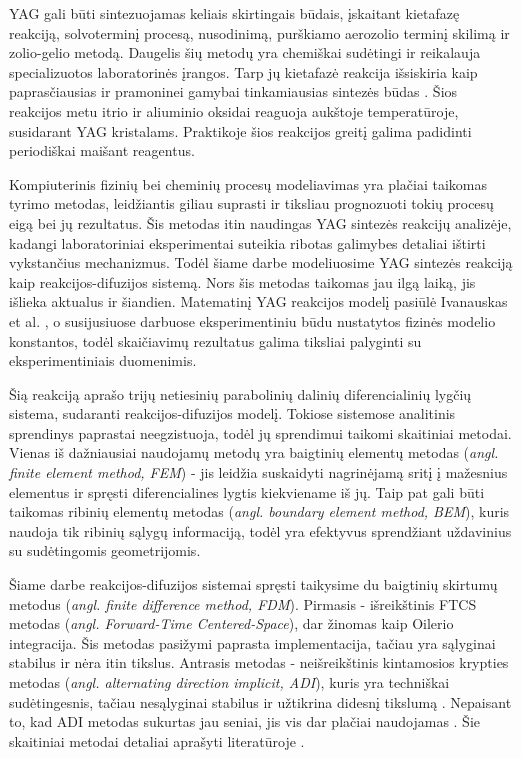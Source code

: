 \documentclass[]{VUMIFTemplateClass}
\begin{document}
YAG gali būti sintezuojamas keliais skirtingais būdais, įskaitant kietafazę reakciją, solvoterminį procesą, nusodinimą, purškiamo aerozolio terminį skilimą ir zolio-gelio metodą. Daugelis šių metodų yra chemiškai sudėtingi ir reikalauja specializuotos laboratorinės įrangos. Tarp jų kietafazė reakcija išsiskiria kaip paprasčiausias ir pramoninei gamybai tinkamiausias sintezės būdas \cite{zhangNovelSynthesisYAG2005}. Šios reakcijos metu itrio ir aliuminio oksidai reaguoja aukštoje temperatūroje, susidarant YAG kristalams. Praktikoje šios reakcijos greitį galima padidinti periodiškai maišant reagentus.

Kompiuterinis fizinių bei cheminių procesų modeliavimas yra plačiai taikomas tyrimo metodas, leidžiantis giliau suprasti ir tiksliau prognozuoti tokių procesų eigą bei jų rezultatus. Šis metodas itin naudingas YAG sintezės reakcijų analizėje, kadangi laboratoriniai eksperimentai suteikia ribotas galimybes detaliai ištirti vykstančius mechanizmus. Todėl šiame darbe modeliuosime YAG sintezės reakciją kaip reakcijos-difuzijos sistemą. Nors šis metodas taikomas jau ilgą laiką, jis išlieka aktualus ir šiandien. Matematinį YAG reakcijos modelį pasiūlė Ivanauskas et al. \cite{ivanauskasModellingSolidState2005}, o susijusiuose darbuose \cite{ivanauskasComputationalModellingYAG2009,mackeviciusCloserLookComputer2012} eksperimentiniu būdu nustatytos fizinės modelio konstantos, todėl skaičiavimų rezultatus galima tiksliai palyginti su eksperimentiniais duomenimis.

Šią reakciją aprašo trijų netiesinių parabolinių dalinių diferencialinių lygčių sistema, sudaranti reakcijos-difuzijos modelį. Tokiose sistemose analitinis sprendinys paprastai neegzistuoja, todėl jų sprendimui taikomi skaitiniai metodai. Vienas iš dažniausiai naudojamų metodų yra baigtinių elementų metodas (\textit{angl. finite element method, FEM}) - jis leidžia suskaidyti nagrinėjamą sritį į mažesnius elementus ir spręsti diferencialines lygtis kiekviename iš jų. Taip pat gali būti taikomas ribinių elementų metodas (\textit{angl. boundary element method, BEM}), kuris naudoja tik ribinių sąlygų informaciją, todėl yra efektyvus sprendžiant uždavinius su sudėtingomis geometrijomis.

Šiame darbe reakcijos-difuzijos sistemai spręsti taikysime du baigtinių skirtumų metodus (\textit{angl. finite difference method, FDM}). Pirmasis - išreikštinis FTCS metodas (\textit{angl. Forward-Time Centered-Space}), dar žinomas kaip Oilerio integracija. Šis metodas pasižymi paprasta implementacija, tačiau yra sąlyginai stabilus ir nėra itin tikslus. Antrasis metodas - neišreikštinis kintamosios krypties metodas (\textit{angl. alternating direction implicit, ADI}), kuris yra techniškai sudėtingesnis, tačiau nesąlyginai stabilus ir užtikrina didesnį tikslumą \cite{doi:10.1137/0103003}. Nepaisant to, kad ADI metodas sukurtas jau seniai, jis vis dar plačiai naudojamas \cite{gaidamauskaiteComparisonFiniteDifference2007}. Šie skaitiniai metodai detaliai aprašyti literatūroje \cite{pressNumericalRecipes3rd2007,levequeFiniteDifferenceMethods2007}.
\end{document}
